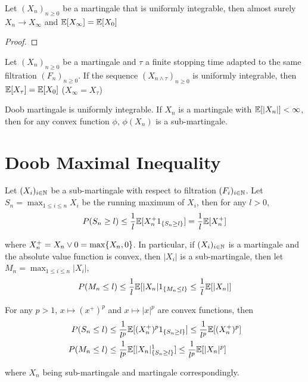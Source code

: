 \documentclass{report}
\begin{document}
\begin{theorem}
	Let $(X_n)_{n \geq 0}$ be a martingale that is uniformly integrable, then almost surely $X_n \to X_\infty$ and $\mathbb{E}[X_\infty] = \mathbb{E}[X_0]$
\begin{proof}
\end{proof}
\end{theorem}

\begin{theorem}
	Let $(X_n)_{n \geq 0}$ be a martingale and $\tau$ a finite stopping time adapted to the same filtration $(F_n)_{n \geq 0}$. If the sequence $(X_{n \wedge \tau})_{n \geq 0}$ is uniformly integrable, then $\mathbb{E}[X_\tau] = \mathbb{E}[X_0]$ ($X_\infty = X_\tau$)
\end{theorem}

\begin{remark}
	Doob martingale is uniformly integrable. If $X_n$ is a martingale with $\mathbb{E}[|X_n|] < \infty$, then for any convex function $\phi$, $\phi(X_n)$ is a sub-martingale.
\end{remark}

\section{Doob Maximal Inequality}

\begin{theorem}
	Let $(X_i)_{i \in \mathbb{N}}$ be a sub-martingale with respect to filtration $(F_i)_{i \in \mathbb{N}}$. Let $S_n = \max_{1 \leq i \leq n} X_i$ be the running maximum of $X_i$, then for any $l > 0$,
	$$
		P(S_n \geq l) \leq \frac{1}{l} \mathbb{E}[X_n^+ 1_{\{S_n \geq l\}}] = \frac{1}{l} \mathbb{E}[X_n^+]
	$$
	
	where $X_n^+ = X_n \vee 0 = \max \{X_n, 0\}$. In particular, if $(X_i)_{i \in \mathbb{N}}$ is a martingale and the absolute value function is convex, then $|X_i|$ is a sub-martingale, then let $M_n = \max_{1 \leq i \leq n} |X_i|$,
	$$
			P(M_n \leq l) \leq \frac{1}{l} \mathbb{E}[|X_n| 1_{\{M_n \leq l\}} \leq \frac{1}{l} \mathbb{E}[|X_n|]
	$$
\end{theorem}

\begin{corollary}
	For any $p > 1$, $x \mapsto (x^+)^p$ and $x \mapsto |x|^p$ are convex functions, then
	\begin{align*}
		P(S_n \leq l) &\leq \frac{1}{l^p} \mathbb{E}[(X_n^+)^p 1_{\{S_n \geq l\}}] \leq \frac{1}{l^p} \mathbb{E}[(X_n^+)^p] \\
		P(M_n \leq l) &\leq \frac{1}{l^p} \mathbb{E}[|X_n|^ 1_{\{S_n \geq l\}}] \leq \frac{1}{l^p} \mathbb{E}[|X_n|^p]
	\end{align*}
	
	where $X_n$ being sub-martingale and martingale correspondingly.
\end{corollary}
\end{document}
